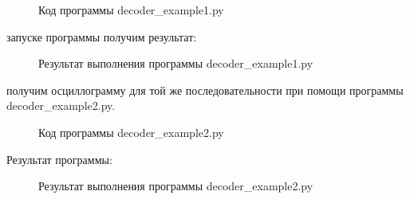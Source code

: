 \documentclass[a4paper14pt]{article}
\begin{document}
\begin{figure}[h!]
    \caption{Код программы decoder\_example1.py}
\end{figure}

 запуске программы получим результат:\\

\begin{figure}[h!]
    \caption{Результат выполнения программы decoder\_example1.py}
\end{figure}

 получим осциллограмму для той же последовательности при помощи программы decoder\_example2.py.\\

\begin{figure}[h!]
    \caption{Код программы decoder\_example2.py}
\end{figure}

Результат программы:\\

\begin{figure}[h!]
    \caption{Результат выполнения программы decoder\_example2.py}
\end{figure}
\newpage
\end{document}
